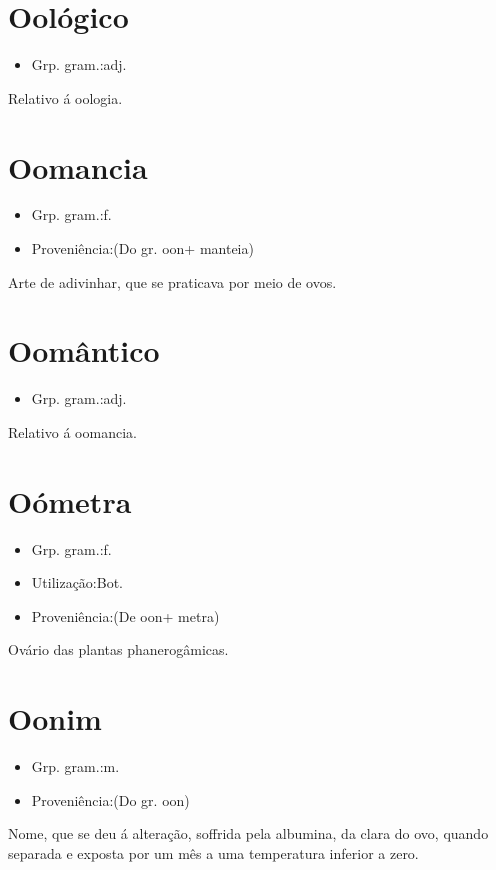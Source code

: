 \section{Oológico}
\begin{itemize}
\item {Grp. gram.:adj.}
\end{itemize}
Relativo á oologia.
\section{Oomancia}
\begin{itemize}
\item {Grp. gram.:f.}
\end{itemize}
\begin{itemize}
\item {Proveniência:(Do gr. \textunderscore oon\textunderscore  + \textunderscore manteia\textunderscore )}
\end{itemize}
Arte de adivinhar, que se praticava por meio de ovos.
\section{Oomântico}
\begin{itemize}
\item {Grp. gram.:adj.}
\end{itemize}
Relativo á oomancia.
\section{Oómetra}
\begin{itemize}
\item {Grp. gram.:f.}
\end{itemize}
\begin{itemize}
\item {Utilização:Bot.}
\end{itemize}
\begin{itemize}
\item {Proveniência:(De \textunderscore oon\textunderscore  + \textunderscore metra\textunderscore )}
\end{itemize}
Ovário das plantas phanerogâmicas.
\section{Oonim}
\begin{itemize}
\item {Grp. gram.:m.}
\end{itemize}
\begin{itemize}
\item {Proveniência:(Do gr. \textunderscore oon\textunderscore )}
\end{itemize}
Nome, que se deu á alteração, soffrida pela albumina, da clara do ovo, quando separada e exposta por um mês a uma temperatura inferior a zero.

